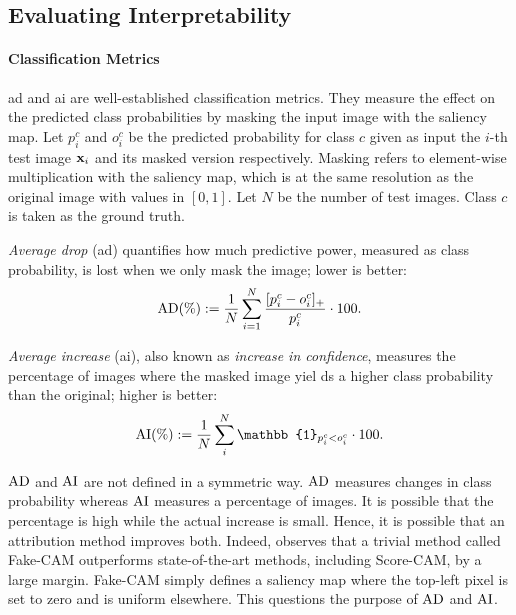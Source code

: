 \subsection{Evaluating Interpretability}
\label{rel:sub_evl}
\paragraph{Classification Metrics}
\gls{ad} and \gls{ai} \autocite{chattopadhay2018grad} are 
well-established classification metrics. 
They measure the effect on the predicted class probabilities by masking the input image with the
 saliency map. Let $p^c_i$ and $o^c_i$ be the predicted probability for class $c$ given as input 
 the $i$-th test image $\mathbf{x}_i$ and its masked version respectively. 
Masking refers to element-wise multiplication with the saliency map, which is at the same 
resolution as the original image with values in $[0,1]$. 
Let $N$ be the number of test images. Class $c$ is taken as the ground truth.

\emph{Average drop} (\gls{ad}) quantifies how much predictive power, measured as class probability, 
is lost when we only mask the image; lower is better:
\begin{equation}
	\operatorname{AD}(\%) \mathrel{:=} \frac{1}{N} \sum_{i=1}^N \frac{[p^c_i - o^c_i]_+}{p^c_i} \cdot 100.
\label{eq:ad}
\end{equation}

\emph{Average increase} (\gls{ai}), also known as \emph{increase in confidence}, measures the 
percentage of images where the masked image yiel ds a higher class probability than the original; 
higher is better:
\begin{equation}
	\AI(\%) \defn \frac{1}{N} \sum_i^N \mathbb{1}_{p^c_i < o^c_i} \cdot 100.
\label{eq:ai}
\end{equation}

$\operatorname{AD}$ and $\operatorname{AI}$ are not defined in a symmetric way. $\operatorname{AD}$ measures changes in class probability 
whereas $\operatorname{AI}$ measures a percentage of images. It is possible that the percentage is high while 
the actual increase is small. Hence, it is possible that an attribution method improves both. 
Indeed, \autocite{poppi2021revisiting} observes that a trivial method called Fake-CAM outperforms 
state-of-the-art methods, including Score-CAM, by a large margin. Fake-CAM simply defines a 
saliency map where the top-left pixel is set to zero and is uniform elsewhere. 
This questions the purpose of $\operatorname{AD}$ and $\operatorname{AI}$.

